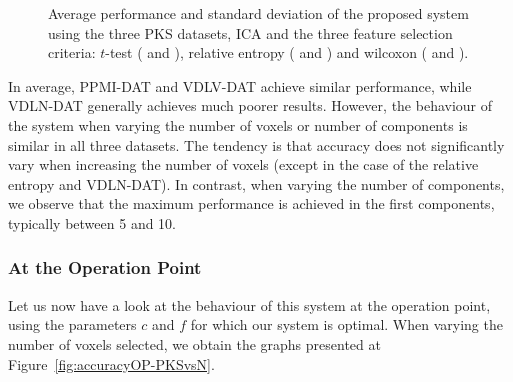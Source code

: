\begin{figure}
	
	\caption[Average performance of the \acs{PKS} datasets in \acs{ICA}.]{Average performance and standard deviation of the proposed system using the three \ac{PKS} datasets, \ac{ICA} and the three feature selection criteria: $t$-test (\protect{} and \protect{}), relative entropy (\protect{} and \protect{}) and wilcoxon (\protect{} and \protect{}). } 
	\label{fig:accuracyMeanICA-PKS}
\end{figure}

In average, PPMI-DAT and VDLV-DAT achieve similar performance, while VDLN-DAT generally achieves much poorer results. However, the behaviour of the system when varying the number of voxels or number of components is similar in all three datasets. The tendency is that accuracy does not significantly vary when increasing the number of voxels (except in the case of the relative entropy and VDLN-DAT). In contrast, when varying the number of components, we observe that the maximum performance is achieved in the first components, typically between 5 and 10. 

\subsubsection{At the Operation Point}
Let us now have a look at the behaviour of this system at the operation point, using the parameters $c$ and $f$ for which our system is optimal. When varying the number of voxels selected, we obtain the graphs presented at Figure~\ref{fig:accuracyOP-PKSvsN}. 

